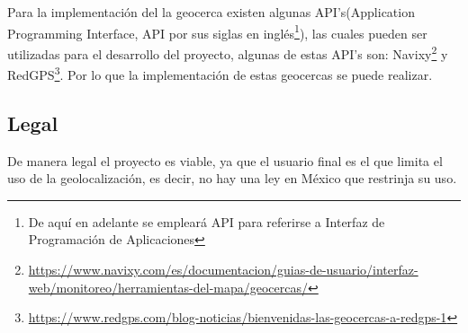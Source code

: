 Para la implementación del la geocerca existen algunas API's(Application Programming Interface, API por sus siglas en inglés\footnote{De aquí en adelante se empleará API para referirse a Interfaz de Programación de Aplicaciones}), las cuales pueden ser utilizadas para el desarrollo del proyecto, algunas de estas API's son: Navixy\footnote{\url{https://www.navixy.com/es/documentacion/guias-de-usuario/interfaz-web/monitoreo/herramientas-del-mapa/geocercas/}} y RedGPS\footnote{\url{https://www.redgps.com/blog-noticias/bienvenidas-las-geocercas-a-redgps-1}}. Por lo que la implementación de estas geocercas se puede realizar.

 \subsection{Legal}

De manera legal el proyecto es viable, ya que el usuario final es el que limita el uso de la geolocalización, es decir, no hay una ley en México que restrinja su uso. 
